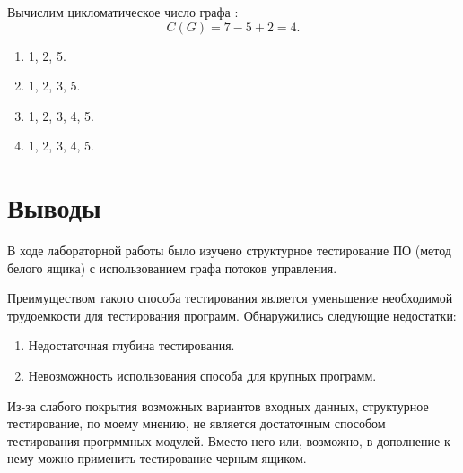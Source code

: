 \documentclass[a4paper,14pt]{extarticle}
\begin{document}
    Вычислим цикломатическое число графа :
    \begin{equation*}
        C(G) = 7 - 5 + 2 = 4.
    \end{equation*}
    \begin{enumerate}
        \item 1, 2, 5.
        \item 1, 2, 3, 5.
        \item 1, 2, 3, 4, 5.
        \item 1, 2, 3, 4, 5.
    \end{enumerate}

    \section{Выводы}

    В ходе лабораторной работы было изучено структурное тестирование
    ПО (метод белого ящика) с использованием графа потоков управления.

    Преимуществом такого способа тестирования является уменьшение необходимой
    трудоемкости для тестирования программ. Обнаружились следующие недостатки:
    \begin{enumerate}
        \item Недостаточная глубина тестирования.
        \item Невозможность использования способа для крупных программ.
    \end{enumerate}

    Из-за слабого покрытия возможных вариантов входных данных, структурное 
    тестирование, по моему мнению, не является достаточным способом тестирования
    прогрммных модулей. Вместо него или, возможно, в дополнение к нему можно
    применить тестирование черным ящиком.
\end{document}
